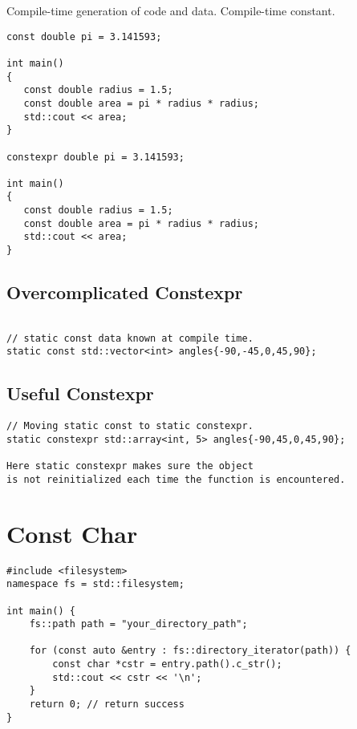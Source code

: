 \documentclass[openany]{report}
\begin{document}
Compile-time generation of code and data. Compile-time constant.

\begin{verbatim}
const double pi = 3.141593;

int main()
{
   const double radius = 1.5;
   const double area = pi * radius * radius;
   std::cout << area;
}

constexpr double pi = 3.141593;

int main()
{
   const double radius = 1.5;
   const double area = pi * radius * radius;
   std::cout << area;
}
\end{verbatim}

\subsection{Overcomplicated Constexpr}

\begin{verbatim}

// static const data known at compile time. 
static const std::vector<int> angles{-90,-45,0,45,90};
\end{verbatim}

\subsection{Useful Constexpr}

\begin{verbatim}
// Moving static const to static constexpr.
static constexpr std::array<int, 5> angles{-90,45,0,45,90};

Here static constexpr makes sure the object
is not reinitialized each time the function is encountered.

\end{verbatim}

\section{Const Char}

\begin{verbatim}
#include <filesystem>
namespace fs = std::filesystem;

int main() {
    fs::path path = "your_directory_path";

    for (const auto &entry : fs::directory_iterator(path)) {
        const char *cstr = entry.path().c_str();
        std::cout << cstr << '\n';
    }
    return 0; // return success
}
\end{verbatim}
\end{document}
